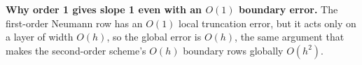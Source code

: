 \textbf{Why order 1 gives slope 1 even with an $O(1)$ boundary error.} The first-order Neumann row has an $O(1)$ local truncation error, but it acts only on a layer of width $O(h)$, so the global error is $O(h)$, the same argument that makes the second-order scheme's $O(h)$ boundary rows globally $O(h^2)$.

